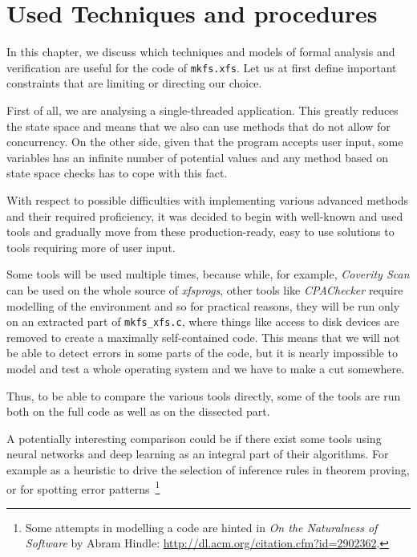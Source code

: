 
\chapter{Used Techniques and procedures}\label{chap:techniques}

In this chapter, we discuss which techniques and models of formal analysis and verification are useful for the code of {\tt mkfs.xfs}. Let us at first define important constraints that are limiting or directing our choice.

First of all, we are analysing a single-threaded application. This greatly reduces the state space and means that we also can use methods that do not allow for concurrency. On the other side, given that the program accepts user input, some variables has an infinite number of potential values and any method based on state space checks has to cope with this fact.

With respect to possible difficulties with implementing various advanced
methods and their required proficiency, it was decided to begin with well-known
and used tools and gradually move from these production-ready, easy to use
solutions to tools requiring more of user input.

Some tools will be used multiple times, because while, for example, {\em
	Coverity Scan} can be used on the whole source of {\em xfsprogs}, other
	tools like {\em CPAChecker} require modelling of the environment and so
	for practical reasons, they will be run only on an extracted part of
{\tt mkfs\_xfs.c}, where things like access to disk devices are removed to
create a maximally self-contained code. This means that we will not be able to
detect errors in some parts of the code, but it is nearly impossible to model
and test a whole operating system and we have to make a cut somewhere. 

Thus, to be able to compare the various tools directly, some of the tools are run both on the full code as well as on the dissected part.

A potentially interesting comparison could be if there exist some tools using neural networks and deep learning as an integral part of their algorithms. For example as a heuristic to drive the selection of inference rules in theorem proving, or for spotting error patterns~\footnote{Some attempts in modelling a code are hinted in {\em On the Naturalness of Software} by Abram Hindle: \url{http://dl.acm.org/citation.cfm?id=2902362}.}


